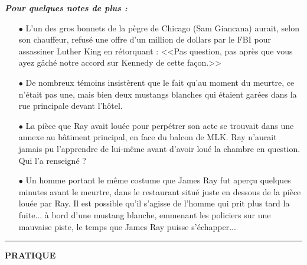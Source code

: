 \documentclass[11pt,twoside,a4paper]{article}
\begin{document}
\begin{multicols*}{2}
\textbf{\textit{\large Pour quelques notes de plus : }}
\begin{itemize}
	\item[$\bullet$] L'un  des gros bonnets de la p{\`e}gre de Chicago (Sam Giancana) aurait, selon son chauffeur, refus{\'e} une offre d'un million de dollars par le FBI pour assassiner Luther King en r{\'e}torquant : <<Pas question, pas apr{\`e}s que vous ayez g{\^a}ch{\'e} notre accord sur Kennedy de cette fa\c{c}on.>> 
	\item[$\bullet$] De nombreux t{\'e}moins insist{\`e}rent que le fait qu'au moment du meurtre, ce n'{\'e}tait pas une, mais bien deux mustangs blanches qui {\'e}taient gar{\'e}es dans la rue principale devant l'h{\^o}tel. 
	\item[$\bullet$] La pi{\`e}ce que Ray avait lou{\'e}e pour perp{\'e}trer son acte se trouvait dans une annexe au b{\^a}timent principal, en face du balcon de MLK. Ray n'aurait jamais pu l'apprendre de lui-m{\^e}me avant d'avoir lou{\'e} la chambre en question. Qui l'a renseign{\'e} ?
	\item[$\bullet$] Un homme portant le m{\^e}me costume que James Ray fut aper\c{c}u quelques minutes avant le meurtre, dans le restaurant situ{\'e} juste en dessous de la pi{\`e}ce lou{\'e}e par Ray. Il est possible qu'il s'agisse de l'homme qui prit plus tard la fuite... {\`a} bord d'une mustang blanche, emmenant les policiers sur une mauvaise piste, le temps que James Ray puisse s'{\'e}chapper...
\end{itemize}

\begin{center} \rule{0.45\textwidth}{0.01cm} \end{center}

\textbf{\Large PRATIQUE}~\\


\end{multicols*}
\end{document}
